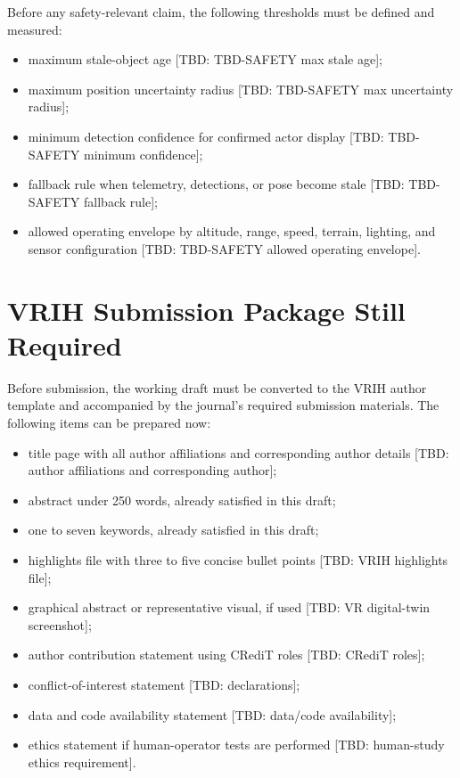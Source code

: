 \documentclass[11pt,a4paper]{article}
\newcommand{\tbd}[1]{\textcolor{publicationred}{[TBD: #1]}}
\begin{document}
Before any safety-relevant claim, the following thresholds must be defined and measured:

\begin{itemize}
    \item maximum stale-object age \tbd{TBD-SAFETY max stale age};
    \item maximum position uncertainty radius \tbd{TBD-SAFETY max uncertainty radius};
    \item minimum detection confidence for confirmed actor display \tbd{TBD-SAFETY minimum confidence};
    \item fallback rule when telemetry, detections, or pose become stale \tbd{TBD-SAFETY fallback rule};
    \item allowed operating envelope by altitude, range, speed, terrain, lighting, and sensor configuration \tbd{TBD-SAFETY allowed operating envelope}.
\end{itemize}

\section{VRIH Submission Package Still Required}

Before submission, the working draft must be converted to the VRIH author template and accompanied by the journal's required submission materials. The following items can be prepared now:

\begin{itemize}
    \item title page with all author affiliations and corresponding author details \tbd{author affiliations and corresponding author};
    \item abstract under 250 words, already satisfied in this draft;
    \item one to seven keywords, already satisfied in this draft;
    \item highlights file with three to five concise bullet points \tbd{VRIH highlights file};
    \item graphical abstract or representative visual, if used \tbd{VR digital-twin screenshot};
    \item author contribution statement using CRediT roles \tbd{CRediT roles};
    \item conflict-of-interest statement \tbd{declarations};
    \item data and code availability statement \tbd{data/code availability};
    \item ethics statement if human-operator tests are performed \tbd{human-study ethics requirement}.
\end{itemize}
\end{document}
